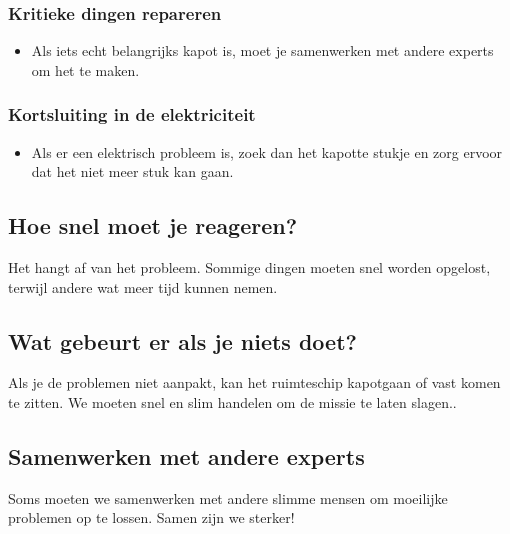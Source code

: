 \subsubsection{Kritieke dingen repareren}
\begin{itemize}
    \item Als iets echt belangrijks kapot is, moet je samenwerken met andere experts om het te maken.
\end{itemize}

\subsubsection{Kortsluiting in de elektriciteit}
\begin{itemize}
    \item Als er een elektrisch probleem is, zoek dan het kapotte stukje en zorg ervoor dat het niet meer stuk kan gaan.
\end{itemize}

\subsection{Hoe snel moet je reageren?}
Het hangt af van het probleem. Sommige dingen moeten snel worden opgelost, terwijl andere wat meer tijd kunnen nemen.

\subsection{Wat gebeurt er als je niets doet?}
Als je de problemen niet aanpakt, kan het ruimteschip kapotgaan of vast komen te zitten. We moeten snel en slim handelen om de missie te laten slagen..

\subsection{Samenwerken met andere experts}
Soms moeten we samenwerken met andere slimme mensen om moeilijke problemen op te lossen. Samen zijn we sterker!